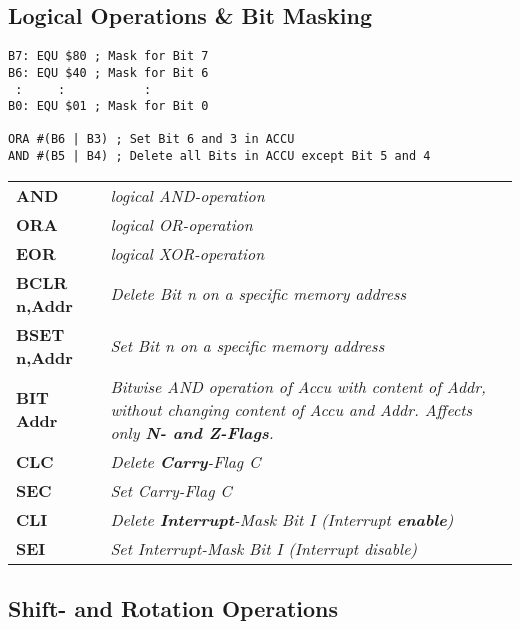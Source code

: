 \subsection{Logical Operations \& Bit Masking}

\begin{lstlisting}
B7: EQU $80 ; Mask for Bit 7
B6: EQU $40 ; Mask for Bit 6
 :     :           :
B0: EQU $01 ; Mask for Bit 0

ORA #(B6 | B3) ; Set Bit 6 and 3 in ACCU
AND #(B5 | B4) ; Delete all Bits in ACCU except Bit 5 and 4
\end{lstlisting}

\begin{tabular}{lp{}}
    \textbf{AND} & \textit{logical AND-operation} \\
    \textbf{ORA} & \textit{logical OR-operation} \\
    \textbf{EOR} & \textit{logical XOR-operation} \\
    \textbf{BCLR n,Addr} & \textit{Delete Bit n on a specific memory address} \\
    \textbf{BSET n,Addr} & \textit{Set Bit n on a specific memory address} \\
    \textbf{BIT Addr} & \textit{
        Bitwise AND operation of Accu with content of Addr,
        without changing content of Accu and Addr.
        Affects only \textbf{N- and Z-Flags}.
    } \\
    \textbf{CLC} & \textit{Delete \textbf{Carry}-Flag C} \\
    \textbf{SEC} & \textit{Set Carry-Flag C} \\
    \textbf{CLI} & \textit{Delete \textbf{Interrupt}-Mask Bit I (Interrupt \textbf{enable})} \\
    \textbf{SEI} & \textit{Set Interrupt-Mask Bit I (Interrupt disable)} \\
\end{tabular}

\subsection{Shift- and Rotation Operations}

